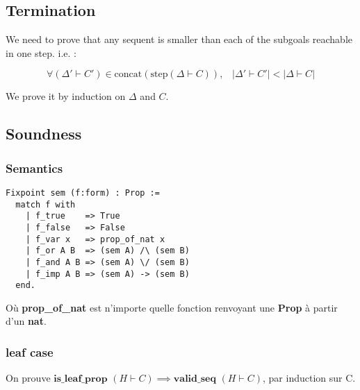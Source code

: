 \documentclass{article}
\begin{document}
\subsection{Termination}

We need to prove that any sequent is smaller than each of the subgoals reachable in one step. i.e. :

$$
\forall (\Delta' \vdash C') \in \text{concat}(\text{step}(\Delta \vdash C)),\;\;\;  |\Delta' \vdash C'| < |\Delta \vdash C|
$$

We prove it by induction on $\Delta$ and $C$.

\subsection{Soundness}
\subsubsection{Semantics}
\begin{verbatim}
Fixpoint sem (f:form) : Prop := 
  match f with
    | f_true    => True
    | f_false   => False
    | f_var x   => prop_of_nat x
    | f_or A B  => (sem A) /\ (sem B)
    | f_and A B => (sem A) \/ (sem B)
    | f_imp A B => (sem A) -> (sem B)
  end.
\end{verbatim}
Où \textbf{prop\_of\_nat} est n'importe quelle fonction renvoyant une \textbf{Prop} à partir d'un \textbf{nat}.

\subsubsection{leaf case}
On prouve $\textbf{is\_leaf\_prop } (H \vdash C) \implies \textbf{valid\_seq } (H \vdash C)$, par induction sur C.
\end{document}
